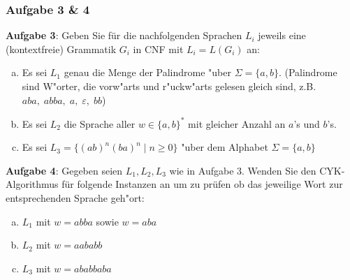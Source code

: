 \documentclass{beamer}
\begin{document}
	\begin{frame} \frametitle{Aufgabe 3 \& 4}
		\footnotesize
		\textbf{Aufgabe 3}:
		Geben Sie für die nachfolgenden Sprachen $L_i$ jeweils
		eine (kontextfreie) Grammatik $G_i$ in CNF mit $L_i=L(G_i)$ an:
		
		\begin{enumerate}[(a)]
			\item Es sei $L_1$ genau die Menge der Palindrome "uber $\Sigma = \{ a, b \} $.
			(Palindrome sind W"orter, die vorw"arts und r"uckw"arts gelesen
			gleich sind, z.B. $ aba, \; abba, \; a, \; \varepsilon , \; bb$)
			\item Es sei $L_2$ die Sprache aller $w \in \{ a, b \}^{ * } $ mit
			gleicher Anzahl an $a$'s und $b$'s.
			\item Es sei $L_3 = \{ (ab)^{n}  (ba)^{n} \mid n \geq 0 \}$
			"uber dem Alphabet $ \Sigma = \{ a, b \} $
		\end{enumerate}
	
		\textbf{Aufgabe 4}:
		Gegeben seien $L_1,L_2,L_3$ wie in Aufgabe 3.
		Wenden Sie den CYK-Algorithmus für folgende Instanzen an
		um zu prüfen ob das jeweilige Wort zur entsprechenden 
		Sprache geh"ort:	
		
		\begin{enumerate}[(a)]
			\item $L_1$ mit $w = abba$ sowie $w = aba$
			\item $L_2$ mit $w = aababb$
			\item $L_3$ mit $w = ababbaba$
		\end{enumerate}
	\end{frame}
\end{document}
